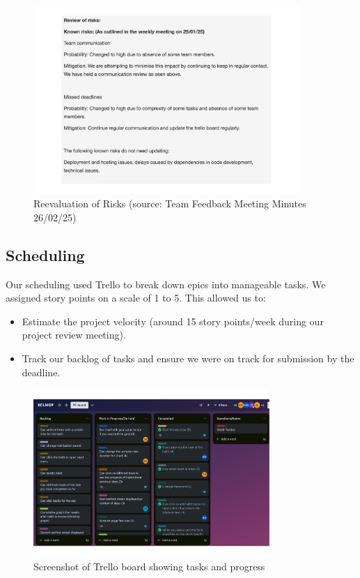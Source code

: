 \begin{figure}[H]
    \centering
    \includegraphics[width=0.9\textwidth]{resources/risk_review.pdf}
    \caption{Reevaluation of Risks (source: Team Feedback Meeting Minutes 26/02/25)}
    \label{fig:reeval_risks}
\end{figure}

\subsection{Scheduling}
Our scheduling used Trello to break down epics into manageable tasks. We assigned story points on a scale of 1 to 5. This allowed us to:
\begin{itemize}
    \item Estimate the project velocity (around 15 story points/week during our project review meeting).
    \item Track our backlog of tasks and ensure we were on track for submission by the deadline.
\end{itemize}

\begin{figure}[H]
    \centering
    \includegraphics[width=0.8\textwidth]{resources/trello_board.pdf}
    \caption{Screenshot of Trello board showing tasks and progress}
    \label{fig:trello_tasks}
\end{figure}

